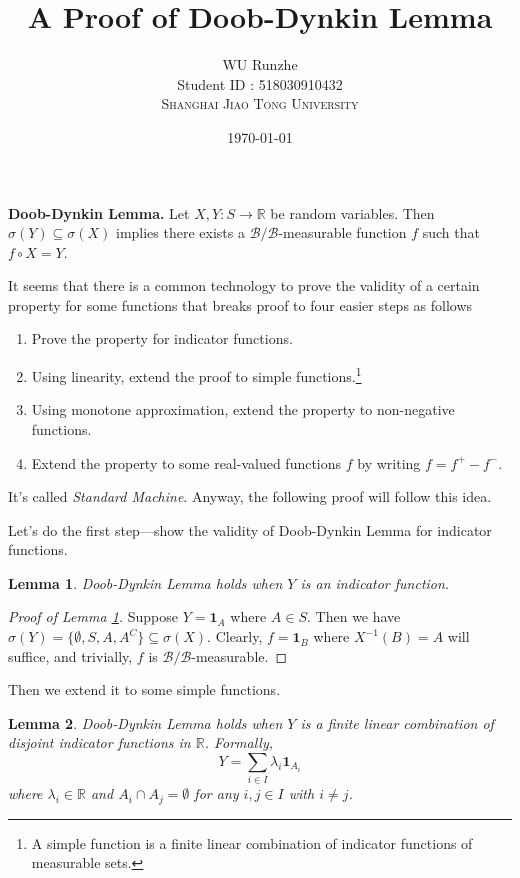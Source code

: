 \documentclass[12pt]{article}
\title{A Proof of Doob-Dynkin Lemma}
\author{WU Runzhe\\
	Student ID : 518030910432\\
	\textsc{Shanghai Jiao Tong University}}
\date{\today}
\newcommand\bR{\mathbb{R}}
\newcommand{\ind}[1]{\mathbf{1}_{#1}}
\newtheorem{lemma}{Lemma}
\begin{document}
	\maketitle
	
	\begin{tcolorbox}
		\textbf{Doob-Dynkin Lemma.}
			Let $X,Y:S\rightarrow \bR$ be random variables. Then $\sigma(Y)\subseteq\sigma(X)$ implies there exists a $\mathcal{B}/\mathcal{B}$-measurable function $f$ such that $f\circ X=Y$.
	\end{tcolorbox}

	It seems that there is a common technology to prove the validity of a certain property for some functions that breaks proof to four easier steps as follows
	
	\begin{enumerate}[(1)]
		\item Prove the property for indicator functions.
		\item Using linearity, extend the proof to simple functions.\footnote{A simple function is a finite linear combination of indicator functions of measurable sets.}
		\item Using monotone approximation, extend the property to non-negative functions.
		\item Extend the property to some real-valued functions $f$ by writing $f=f^+-f^-$.
	\end{enumerate}

	It's called \textit{Standard Machine}. Anyway, the following proof will follow this idea.
	
	Let's do the first step---show the validity of Doob-Dynkin Lemma for indicator functions.

	\begin{lemma}\label{indic_func}
		Doob-Dynkin Lemma holds when $Y$ is an indicator function.
	\end{lemma}

	\begin{proof}[Proof of Lemma \ref{indic_func}]
		Suppose $Y=\ind{A}$ where $A\in S$. Then we have  $\sigma(Y)=\{\emptyset,S,A,A^C\}\subseteq\sigma(X)$. Clearly, $f=\ind{B}$ where $X^{-1}(B)=A$ will suffice, and trivially, $f$ is $\mathcal{B}/\mathcal{B}$-measurable.
	\end{proof}

	Then we extend it to some simple functions.

	\begin{lemma}\label{sim}
		Doob-Dynkin Lemma holds when $Y$ is a finite linear combination of disjoint indicator functions in $\bR$. Formally, 
		$$Y=\sum_{i\in I}\lambda_i\ind{A_i}$$
		where $\lambda_i\in\bR$ and $A_i\cap A_j=\emptyset$ for any $i,j\in I$ with $i\not=j$.
	\end{lemma}
\end{document}
